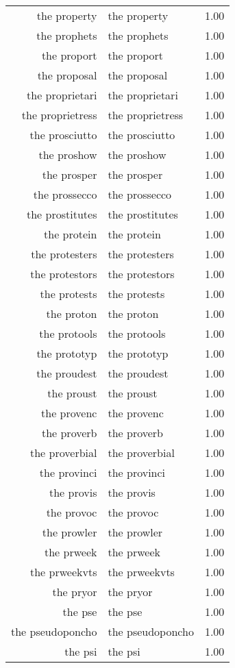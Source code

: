 \begin{table}[ht]
\begin{tabular}{rlr}
  the property & the property & 1.00 \\ 
  the prophets & the prophets & 1.00 \\ 
  the proport & the proport & 1.00 \\ 
  the proposal & the proposal & 1.00 \\ 
  the proprietari & the proprietari & 1.00 \\ 
  the proprietress & the proprietress & 1.00 \\ 
  the prosciutto & the prosciutto & 1.00 \\ 
  the proshow & the proshow & 1.00 \\ 
  the prosper & the prosper & 1.00 \\ 
  the prossecco & the prossecco & 1.00 \\ 
  the prostitutes & the prostitutes & 1.00 \\ 
  the protein & the protein & 1.00 \\ 
  the protesters & the protesters & 1.00 \\ 
  the protestors & the protestors & 1.00 \\ 
  the protests & the protests & 1.00 \\ 
  the proton & the proton & 1.00 \\ 
  the protools & the protools & 1.00 \\ 
  the prototyp & the prototyp & 1.00 \\ 
  the proudest & the proudest & 1.00 \\ 
  the proust & the proust & 1.00 \\ 
  the provenc & the provenc & 1.00 \\ 
  the proverb & the proverb & 1.00 \\ 
  the proverbial & the proverbial & 1.00 \\ 
  the provinci & the provinci & 1.00 \\ 
  the provis & the provis & 1.00 \\ 
  the provoc & the provoc & 1.00 \\ 
  the prowler & the prowler & 1.00 \\ 
  the prweek & the prweek & 1.00 \\ 
  the prweekvts & the prweekvts & 1.00 \\ 
  the pryor & the pryor & 1.00 \\ 
  the pse & the pse & 1.00 \\ 
  the pseudoponcho & the pseudoponcho & 1.00 \\ 
  the psi & the psi & 1.00 \\ 

\end{tabular}
\end{table}
